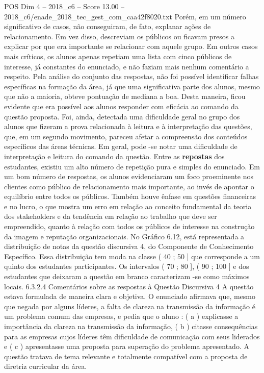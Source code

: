 \begin{textsample}{POS Dim 4 – 2018\_c6 – Score 13.00 – 2018\_c6/enade\_2018\_tec\_gest\_com\_caa42f8020.txt}
Porém, em um número significativo de casos, não conseguiram, de fato, explanar ações de relacionamento.
Em vez disso, descreviam os públicos ou ficavam presos a explicar por que era importante se relacionar com aquele grupo.
Em outros casos mais críticos, os alunos apenas repetiam uma lista com cinco públicos de interesse, já constantes do enunciado, e não faziam mais nenhum comentário a respeito.
Pela análise do conjunto das respostas, não foi possível identificar falhas específicas na formação da área, já que uma significativa parte dos alunos, mesmo que não a maioria, obteve pontuação de mediana a boa.
Desta maneira, ficou evidente que era possível aos alunos responder com eficácia ao comando da questão proposta.
Foi, ainda, detectada uma dificuldade geral no grupo dos alunos que fizeram a prova relacionada à leitura e à interpretação das questões, que, em um segundo movimento, pareceu afetar a compreensão dos conteúdos específicos das áreas técnicas.
Em geral, pode -se notar uma dificuldade de interpretação e leitura do comando da questão.
Entre as \textbf{repostas} dos estudantes, existiu um alto número de repetição pura e simples do enunciado.
Em um bom número de respostas, os alunos evidenciaram um foco proeminente nos clientes como público de relacionamento mais importante, ao invés de apontar o equilíbrio entre todos os públicos.
Também houve ênfase em questões financeiras e no lucro, o que mostra um erro em relação ao conceito fundamental da teoria dos stakeholders e da tendência em relação ao trabalho que deve ser empreendido, quanto à relação com todos os públicos de interesse na construção da imagem e reputação organizacionais.
No Gráfico 6.12, está representada a distribuição de notas da questão discursiva 4, do Componente de Conhecimento Específico.
Essa distribuição tem moda na classe ( 40 ; 50 ] que corresponde a um quinto dos estudantes participantes.
Os intervalos ( 70 ; 80 ], ( 90 ; 100 ] e dos estudantes que deixaram a questão em branco caracterizam -se como máximos locais. 6.3.2.4 Comentários sobre as respostas à Questão Discursiva 4 A questão estava formulada de maneira clara e objetiva.
O enunciado afirmava que, mesmo que negada por alguns líderes, a falta de clareza na transmissão da informação é um problema comum das empresas, e pedia que o aluno : ( a ) explicasse a importância da clareza na transmissão da informação, ( b ) citasse consequências para as empresas cujos líderes têm dificuldade de comunicação com seus liderados e ( c ) apresentasse uma proposta para superação do problema apresentado.
A questão tratava de tema relevante e totalmente compatível com a proposta de diretriz curricular da área.

\end{textsample}
